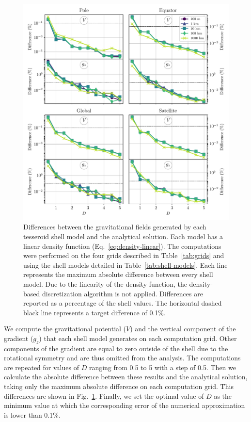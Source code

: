 \documentclass[extra, referee]{gji}
\begin{document}
\begin{figure}
\centering
\includegraphics[width=\linewidth]{figures/linear-density-diffs.pdf}
\caption{
    Differences between the gravitational fields generated by each tesseroid shell model
    and the analytical solution.
    Each model has a linear density function (Eq.~\ref{eq:density-linear}).
    The computations were performed on the four grids described in Table~\ref{tab:grids}
    and using the shell models detailed in Table~\ref{tab:shell-models}.
    Each line represents the maximum absolute difference between every shell model.
    Due to the linearity of the density function, the density-based discretization
    algorithm is not applied.
    Differences are reported as a percentage of the shell values.
    The horizontal dashed black line represents a target difference of 0.1\%.
}
\label{fig:D-linear}
\end{figure}

We compute the gravitational potential ($V$) and the vertical component of the gradient
($g_z$) that each shell model generates on each computation grid.
Other components of the gradient are equal to zero outside of the shell due to the
rotational symmetry and are thus omitted from the analysis.
The computations are repeated for values of $D$ ranging from 0.5 to 5 with a step of
0.5.
Then we calculate the absolute difference between these results and the analytical
solution, taking only the maximum absolute difference on each computation grid.
This differences are shown in Fig.~\ref{fig:D-linear}.
Finally, we set the optimal value of $D$ as the minimum value at which the corresponding
error of the numerical approximation is lower than 0.1\%.
\end{document}
